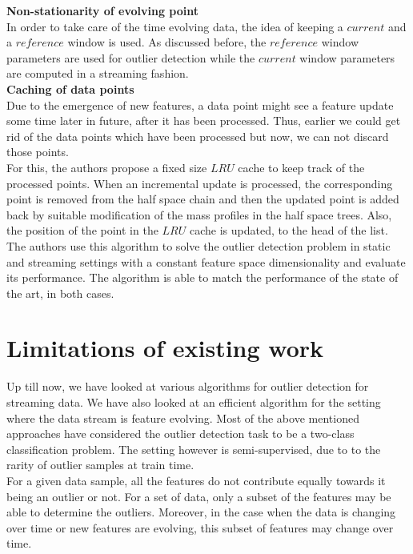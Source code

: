 \noindent \textbf{Non-stationarity of evolving point} \\

In order to take care of the time evolving data, the idea of keeping a $current$ and a $reference$ window is used. As discussed before, the $reference$ window parameters are used for outlier detection while the $current$ window parameters are computed in a streaming fashion. \\

\noindent \textbf{Caching of data points} \\

Due to the emergence of new features, a data point might see a feature update some time later in future, after it has been processed. Thus, earlier we could get rid of the data points which have been processed but now, we can not discard those points. \\

For this, the authors propose a fixed size $LRU$ cache to keep track of the processed points. When an incremental update is processed, the corresponding point is removed from the half space chain and then the updated point is added back by suitable modification of the mass profiles in the half space trees. Also, the position of the point in the $LRU$ cache is updated, to the head of the list. \\

The authors use this algorithm to solve the outlier detection problem in static and streaming settings with a constant feature space dimensionality and evaluate its performance. The algorithm is able to match the performance of the state of the art, in both cases.

\section{Limitations of existing work}

Up till now, we have looked at various algorithms for outlier detection for streaming data. We have also looked at an efficient algorithm for the setting where the data stream is feature evolving. Most of the above mentioned approaches have considered the outlier detection task to be a two-class classification problem. The setting however is semi-supervised, due to to the rarity of outlier samples at train time. \\

For a given data sample, all the features do not contribute equally towards it being an outlier or not. For a set of data, only a subset of the features may be able to determine the outliers. Moreover, in the case when the data is changing over time or new features are evolving, this subset of features may change over time. \\

